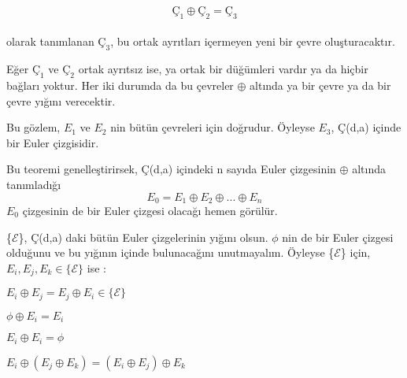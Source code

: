 \documentclass[11pt]{amsbook}
\begin{document}

\[Ç_1 \oplus Ç_2=Ç_3\] \\
olarak tanımlanan $Ç_3$, bu ortak ayrıtları içermeyen yeni bir çevre oluşturacaktır.

Eğer $Ç_1$ ve $Ç_2$ ortak ayrıtsız ise, ya ortak bir düğümleri vardır ya da hiçbir bağları yoktur. Her iki durumda da bu çevreler $\oplus$ altında ya bir çevre ya da bir çevre yığını verecektir. 

Bu gözlem, $E_1$ ve $E_2$ nin bütün çevreleri için doğrudur. Öyleyse $E_3$, Ç(d,a) içinde bir Euler çizgisidir. %

Bu teoremi genelleştirirsek, Ç(d,a) içindeki n sayıda Euler çizgesinin $\oplus$ altında tanımladığı\\
\[E_0 = E_1 \oplus E_2 \oplus ... \oplus E_n\]
$E_0$ çizgesinin de bir Euler çizgesi olacağı hemen görülür.

\{$\mathscr{E}$\}, Ç(d,a) daki bütün Euler çizgelerinin yığını olsun.  $\phi$ nin de bir Euler çizgesi olduğunu ve bu yığının içinde bulunacağını unutmayalım. Öyleyse \{$\mathscr{E}$\} için, $E_i, E_j, E_k \in \{ \mathscr{E} \}$ ise : \\ %
\begin{hEnumerateAlpha}
\item $E_i \oplus E_j = E_j \oplus E_i \in \{\mathscr{E}\}$
\item $\phi \oplus E_i = E_i $
\item $E_i \oplus E_i = \phi $
\item $E_i \oplus ( E_j \oplus E_k) = (E_i\oplus E_j) \oplus E_k$
\end{hEnumerateAlpha}
\end{document}
